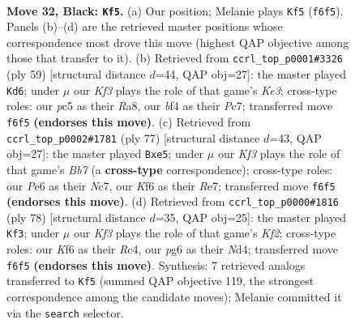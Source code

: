 \documentclass[11pt]{article}
\begin{document}
\clearpage

\begin{figure}[p]\centering
\begin{subfigure}{0.46\textwidth}\centering
\resizebox{\linewidth}{!}{%
\newchessgame
\chessboard[
  setfen={rnb5/p7/2p1pkP1/P1PpN3/1P3B2/2P5/5K2/R7 b - - 2 32},
  showmover=false,
  pgfstyle=straightmove, color=movearrow, markmove={f6-f5}
]}
\caption{}
\end{subfigure}\hfill
\begin{subfigure}{0.46\textwidth}\centering
\resizebox{\linewidth}{!}{%
\newchessgame
\chessboard[
  setfen={r7/2p5/p1N1kp1p/1pRn2p1/3P4/6P1/PP3P1P/5K2 b - - 4 30},
  showmover=false,
  pgfstyle=straightmove, color=movearrow, markmove={e6-d6}
]}
\caption{}
\end{subfigure}
\\[4pt]
\begin{subfigure}{0.46\textwidth}\centering
\resizebox{\linewidth}{!}{%
\newchessgame
\chessboard[
  setfen={8/1kn1r2p/p5p1/R1P1Np2/1P3P2/3KB3/1b4PP/8 b - - 1 39},
  showmover=false,
  pgfstyle=straightmove, color=movearrow, markmove={b2-e5}
]}
\caption{}
\end{subfigure}\hfill
\begin{subfigure}{0.46\textwidth}\centering
\resizebox{\linewidth}{!}{%
\newchessgame
\chessboard[
  setfen={5k2/6p1/1p1rp3/p1n4p/P1RN1P1P/6P1/4PK2/8 w - - 2 40},
  showmover=false,
  pgfstyle=straightmove, color=movearrow, markmove={f2-f3}
]}
\caption{}
\end{subfigure}
\caption{\textbf{Move 32, Black: \texttt{Kf5}.} (a) Our position; Melanie plays \texttt{Kf5} (\texttt{f6f5}). Panels (b)--(d) are the retrieved master positions whose correspondence most drove this move (highest QAP objective among those that transfer to it). (b) Retrieved from \texttt{ccrl\_top\_p0001\#3326} (ply 59) [structural distance $d$=44, QAP obj=27]: the master played \texttt{Kd6}; under $\mu$ our \emph{Kf3} plays the role of that game's \emph{Ke3}; cross-type roles: our \emph{p}c5 as their \emph{R}a8, our \emph{b}f4 as their \emph{P}c7; transferred move \texttt{f6f5} \textbf{(endorses this move)}. (c) Retrieved from \texttt{ccrl\_top\_p0002\#1781} (ply 77) [structural distance $d$=43, QAP obj=27]: the master played \texttt{Bxe5}; under $\mu$ our \emph{Kf3} plays the role of that game's \emph{Bb7} (a \textbf{cross-type} correspondence); cross-type roles: our \emph{P}e6 as their \emph{N}c7, our \emph{K}f6 as their \emph{R}e7; transferred move \texttt{f6f5} \textbf{(endorses this move)}. (d) Retrieved from \texttt{ccrl\_top\_p0000\#1816} (ply 78) [structural distance $d$=35, QAP obj=25]: the master played \texttt{Kf3}; under $\mu$ our \emph{Kf3} plays the role of that game's \emph{Kf2}; cross-type roles: our \emph{K}f6 as their \emph{R}c4, our \emph{p}g6 as their \emph{N}d4; transferred move \texttt{f6f5} \textbf{(endorses this move)}. Synthesis: 7 retrieved analogs transferred to \texttt{Kf5} (summed QAP objective 119, the strongest correspondence among the candidate moves); Melanie committed it via the \texttt{search} selector.}
\label{fig:thought-m63}
\end{figure}
\end{document}
